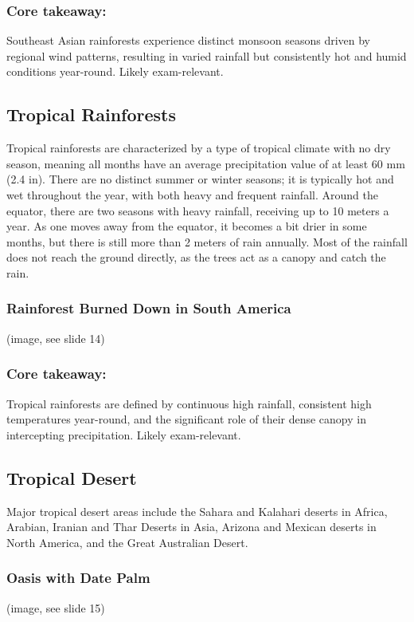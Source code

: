 \subsubsection*{Core takeaway:} 
Southeast Asian rainforests experience distinct monsoon seasons driven by regional wind patterns, resulting in varied rainfall but consistently hot and humid conditions year-round. Likely exam-relevant.


\subsection{Tropical Rainforests} 
Tropical rainforests are characterized by a type of tropical climate with no dry season, meaning all months have an average precipitation value of at least 60 mm (2.4 in). There are no distinct summer or winter seasons; it is typically hot and wet throughout the year, with both heavy and frequent rainfall. Around the equator, there are two seasons with heavy rainfall, receiving up to 10 meters a year. As one moves away from the equator, it becomes a bit drier in some months, but there is still more than 2 meters of rain annually. Most of the rainfall does not reach the ground directly, as the trees act as a canopy and catch the rain. 

\subsubsection{Rainforest Burned Down in South America} (image, see slide 14)
\subsubsection*{Core takeaway:} 
Tropical rainforests are defined by continuous high rainfall, consistent high temperatures year-round, and the significant role of their dense canopy in intercepting precipitation. Likely exam-relevant.


\subsection{Tropical Desert} Major tropical desert areas include the Sahara and Kalahari deserts in Africa, Arabian, Iranian and Thar Deserts in Asia, Arizona and Mexican deserts in North America, and the Great Australian Desert. 

\subsubsection{Oasis with Date Palm} (image, see slide 15) 

